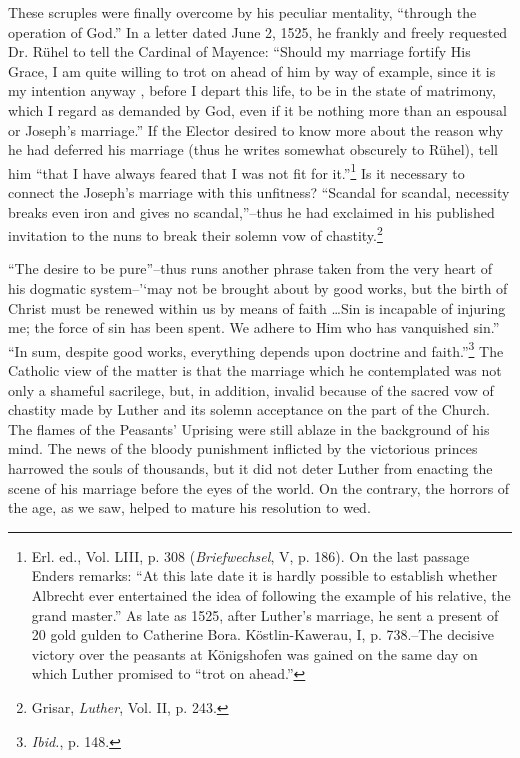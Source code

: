 These scruples were finally overcome by his peculiar mentality,
“through the operation of God.” In a letter dated June 2, 1525, he
frankly and freely requested Dr. Rühel to tell the Cardinal of Mayence:
“Should my marriage fortify His Grace, I am quite willing to
trot on ahead of him by way of example, since it is my intention anyway
, before I depart this life, to be in the state of matrimony, which
I regard as demanded by God, even if it be nothing more than an
espousal or Joseph’s marriage.” If the Elector desired to know more
about the reason why he had deferred his marriage (thus he writes
somewhat obscurely to Rühel), tell him “that I have always feared
that I was not fit for it.”\footnote
{Erl. ed., Vol. LIII, p. 308 (\textit{Briefwechsel}, V, p. 186). On the last passage Enders remarks:
``At this late date it is hardly possible to establish whether Albrecht ever entertained
the idea of following the example of his relative, the grand master.'' As late as
1525, after Luther's marriage, he sent a present of 20 gold gulden to Catherine Bora.
Köstlin-Kawerau, I, p. 738.--The decisive victory over the peasants at Königshofen was
gained on the same day on which Luther promised to ``trot on ahead.''}
Is it necessary to connect the Joseph’s
marriage with this unfitness? “Scandal for scandal, necessity breaks
even iron and gives no scandal,”--thus he had exclaimed in his published
invitation to the nuns to break their solemn vow of chastity.\footnote
{Grisar, \textit{Luther}, Vol. II, p. 243. }

“The desire to be pure”--thus runs another phrase taken from the
very heart of his dogmatic system--'‘may not be brought about by
good works, but the birth of Christ must be renewed within us by
means of faith \dots Sin is incapable of injuring me; the force of
sin has been spent. We adhere to Him who has vanquished sin.” “In
sum, despite good works, everything depends upon doctrine and
faith.”\footnote{\textit{Ibid.}, p. 148. }
The Catholic view of the matter is that the marriage which
he contemplated was not only a shameful sacrilege, but, in addition,
invalid because of the sacred vow of chastity made by Luther and
its solemn acceptance on the part of the Church.
The flames of the Peasants’ Uprising were still ablaze in the background
of his mind. The news of the bloody punishment inflicted by
the victorious princes harrowed the souls of thousands, but it did
not deter Luther from enacting the scene of his marriage before the
eyes of the world. On the contrary, the horrors of the age, as we saw,
helped to mature his resolution to wed.

